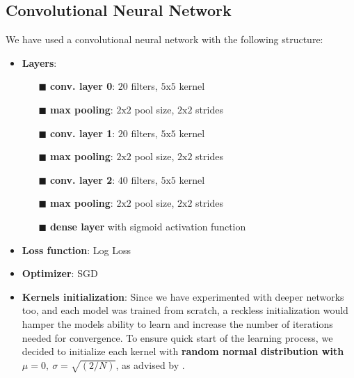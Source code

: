         \subsection{Convolutional Neural Network}
        We have used a convolutional neural network with the following structure:
        \begin{itemize}
            \item \textbf{Layers}:
            \begin{itemize}
            \item[$\blacksquare$] \textbf{conv. layer 0}: $20$ filters, $5 \text{x} 5$ kernel
            \item[$\blacksquare$] \textbf{max pooling}: $2 \text{x} 2$ pool size, $2 \text{x} 2$ strides
            \item[$\blacksquare$] \textbf{conv. layer 1}: $20$ filters, $5 \text{x} 5$ kernel
            \item[$\blacksquare$] \textbf{max pooling}: $2 \text{x} 2$ pool size, $2 \text{x} 2$ strides
            \item[$\blacksquare$] \textbf{conv. layer 2}: $40$ filters, $5 \text{x} 5$ kernel
            \item[$\blacksquare$] \textbf{max pooling}: $2 \text{x} 2$ pool size, $2 \text{x} 2$ strides
            \item[$\blacksquare$] \textbf{dense layer} with sigmoid activation function
            \end{itemize}
            \item \textbf{Loss function}: Log Loss
            \item \textbf{Optimizer}: SGD
            \item \textbf{Kernels initialization}: Since we have experimented with deeper
            networks too, and each model was trained from scratch, a reckless initialization
            would hamper the models ability to learn and increase the number of
            iterations needed for convergence. To ensure quick start of the learning
            process, we decided to initialize each kernel with \textbf{random normal
            distribution with $\mu = 0,\ \sigma = \sqrt{(2 / N)}$}, as advised by
            \citeauthor{initialization}.
        \end{itemize}


